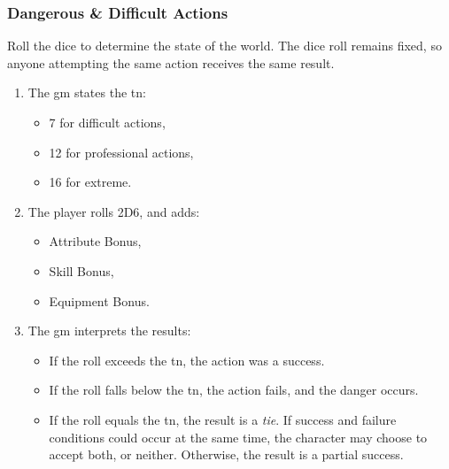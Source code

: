 \subsubsection*{Dangerous \& Difficult Actions}

Roll the dice to determine the state of the world.
The dice roll remains fixed, so anyone attempting the same action receives the same result.

\begin{enumerate}
  \item
  The \gls{gm} states the \gls{tn}:

  \begin{itemize}
    \item
    7 for difficult actions,
    \item
    12 for professional actions,
    \item
    16 for extreme.
  \end{itemize}
  \item
  The player rolls 2D6, and adds:
  \begin{itemize}
    \item
    Attribute Bonus,
    \item
    Skill Bonus,
    \item
    Equipment Bonus.
  \end{itemize}
  \item
  The \gls{gm} interprets the results:
  \begin{itemize}
    \item
    If the roll exceeds the \gls{tn}, the action was a success.
    \item
    If the roll falls below the \gls{tn}, the action fails, and the danger occurs.
    \item
    If the roll equals the \gls{tn}, the result is a \emph{tie}.
    If success and failure conditions could occur at the same time, the character may choose to accept both, or neither.
    Otherwise, the result is a partial success.
    \end{itemize}
\end{enumerate}
